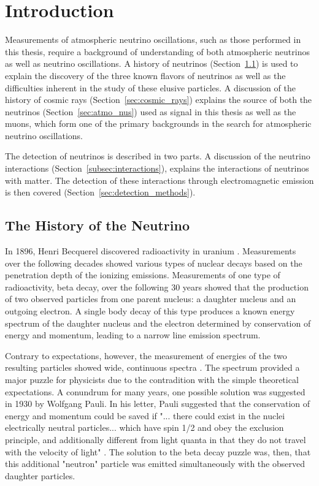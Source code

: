 \graphicspath{{chapters/introduction/images/}}
\chapter{Introduction}
\label{chapter:introduction}
Measurements of atmospheric neutrino oscillations, such as those performed in this thesis, require a background of understanding of both atmospheric neutrinos as well as neutrino oscillations. 
A history of neutrinos (Section~\ref{sec:neutrinos}) is used to explain the discovery of the three known flavors of neutrinos as well as the difficulties inherent in the study of these elusive particles.
A discussion of the history of cosmic rays (Section~\ref{sec:cosmic_rays}) explains the source of both the neutrinos (Section~\ref{sec:atmo_nus}) used as signal in this thesis as well as the muons, which form one of the primary backgrounds in the search for atmospheric neutrino oscillations.

The detection of neutrinos is described in two parts.
A discussion of the neutrino interactions (Section~\ref{subsec:interactions}), explains the interactions of neutrinos with matter.
The detection of these interactions through electromagnetic emission is then covered (Section~\ref{sec:detection_methods}).

\section{The History of the Neutrino}
\label{sec:neutrinos}
In 1896, Henri Becquerel discovered radioactivity in uranium \cite{Becquerel}.
Measurements over the following decades showed various types of nuclear decays based on the penetration depth of the ionizing emissions.
Measurements of one type of radioactivity, beta decay, over the following 30 years showed that the production of two observed particles from one parent nucleus: a daughter nucleus and an outgoing electron.
A single body decay of this type produces a known energy spectrum of the daughter nucleus and the electron determined by conservation of energy and momentum, leading to a narrow line emission spectrum.

Contrary to expectations, however, the measurement of energies of the two resulting particles showed wide, continuous spectra \cite{Chadwick}. 
The spectrum provided a major puzzle for physicists due to the contradition with the simple theoretical expectations.
A conundrum for many years, one possible solution was suggested in 1930 by Wolfgang Pauli.
In his letter, Pauli suggested that the conservation of energy and momentum could be saved if "... there could exist in the nuclei electrically neutral particles... which have spin 1/2 and obey the exclusion principle, and additionally different from light quanta in that they do not travel with the velocity of light" \cite{Pauli-Nu}.
The solution to the beta decay puzzle was, then, that this additional "neutron" particle was emitted simultaneously with the observed daughter particles.

